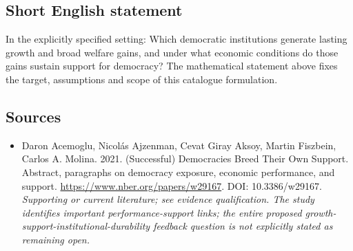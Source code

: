 \documentclass[11pt]{article}
\begin{document}
\subsection{Short English statement}
In the explicitly specified setting: Which democratic institutions generate lasting growth and broad welfare gains, and under what economic conditions do those gains sustain support for democracy? The mathematical statement above fixes the target, assumptions and scope of this catalogue formulation.

\subsection{Sources}
\begin{itemize}\raggedright
\item[\textnormal{[S1]}]\hypertarget{source:30007670:1}{} Daron Acemoglu, Nicolás Ajzenman, Cevat Giray Aksoy, Martin Fiszbein, Carlos A. Molina. 2021. (Successful) Democracies Breed Their Own Support. Abstract, paragraphs on democracy exposure, economic performance, and support.
\url{https://www.nber.org/papers/w29167}.
DOI: 10.3386/w29167.
{\small\textit{Supporting or current literature; see evidence qualification. The study identifies important performance-support links; the entire proposed growth-support-institutional-durability feedback question is not explicitly stated as remaining open.}}
\end{itemize}
\end{document}
